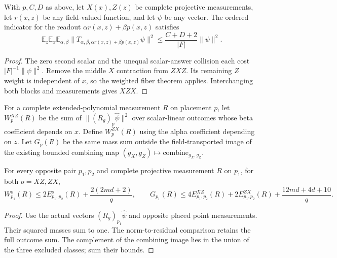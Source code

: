 \begin{theorem}
\label{thm:qld-wrong-variable-norm}
\leanok
With $p,C,D$ as above, let $X(x),Z(z)$ be complete projective measurements,
let $r(x,z)$ be any field-valued function, and let $\psi$ be any vector.
The ordered indicator for the readout $\alpha r(x,z)+\beta p(x,z)$ satisfies
\[
 \mathbb E_z\mathbb E_x\mathbb E_{\alpha,\beta}
   \|T_{\alpha,\beta,\alpha r(x,z)+\beta p(x,z)}\psi\|^2
 \leq \frac{C+D+2}{|F|}\|\psi\|^2.
\]
\end{theorem}
\begin{proof}
\leanok
{}
The zero second scalar and the unequal scalar-answer collision each cost
$|F|^{-1}\|\psi\|^2$. Remove the middle $X$ contraction from $ZXZ$.
Its remaining $Z$ weight is independent of $x$, so the weighted fiber
theorem applies. Interchanging both blocks and measurements gives $XZX$.
\end{proof}

\begin{definition}
\label{def:qld-wrong-variable-masses}
\leanok
For a complete extended-polynomial measurement $R$ on placement $p$, let
$W_p^{XZ}(R)$ be the sum of $\|(R_g)_p\hat\psi\|^2$ over scalar-linear
outcomes whose beta coefficient depends on $x$. Define $W_p^{ZX}(R)$
using the alpha coefficient depending on $z$.
Let $G_p(R)$ be the same mass sum outside the field-transported image of
the existing bounded combining map $(g_X,g_Z)\mapsto\mathrm{combine}_{g_X,g_Z}$.
\end{definition}

\begin{theorem}
\label{thm:qld-actual-separated-mass}
\leanok
For every opposite pair $p_1,p_2$ and complete projective measurement $R$
on $p_1$, for both $o=XZ,ZX$,
\[
 W_{p_1}^{o}(R)\leq2E^o_{p_1,p_2}(R)+\frac{2(2md+2)}q,
\qquad
 G_{p_1}(R)\leq4E^{XZ}_{p_1,p_2}(R)+2E^{ZX}_{p_1,p_2}(R)
                  +\frac{12md+4d+10}q.
\]
\end{theorem}
\begin{proof}
\leanok
{}
Use the actual vectors $(R_g)_{p_1}\hat\psi$ and opposite placed point
measurements. Their squared masses sum to one. The norm-to-residual
comparison retains the full outcome sum. The complement of the combining
image lies in the union of the three excluded classes; sum their bounds.
\end{proof}

